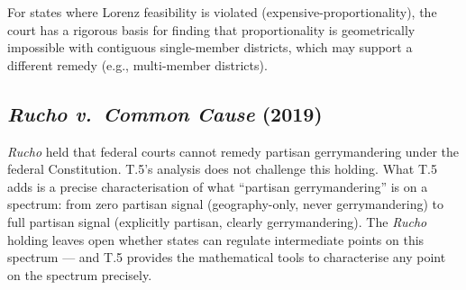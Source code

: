 For states where Lorenz feasibility is violated (expensive-proportionality),
the court has a rigorous basis for finding that proportionality is geometrically
impossible with contiguous single-member districts, which may support a
different remedy (e.g., multi-member districts).

\subsection{\emph{Rucho v.\ Common Cause} (2019)}

\emph{Rucho} held that federal courts cannot remedy partisan gerrymandering
under the federal Constitution.
T.5's analysis does not challenge this holding.
What T.5 adds is a precise characterisation of what ``partisan gerrymandering''
is on a spectrum: from zero partisan signal (geography-only, never gerrymandering)
to full partisan signal (explicitly partisan, clearly gerrymandering).
The \emph{Rucho} holding leaves open whether states can regulate intermediate
points on this spectrum --- and T.5 provides the mathematical tools to
characterise any point on the spectrum precisely.
